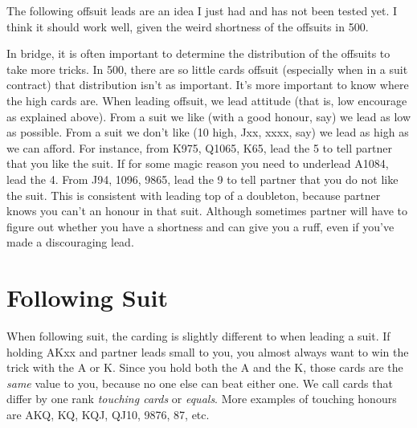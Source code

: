 \documentclass[a4paper]{report}
\theoremstyle{question}
\theoremstyle{theorem}
\theoremstyle{definition}
\newcommand{\<}{\left\langle}%
\renewcommand{\>}{\right\rangle}%
\begin{document}

The following offsuit leads are an idea I just had and has not been tested yet. I think it should work well, given the weird shortness of the offsuits in 500.

In bridge, it is often important to determine the distribution of the offsuits to take more tricks. In 500, there are so little cards offsuit (especially when in a suit contract) that distribution isn't as important. It's more important to know where the high cards are. When leading offsuit, we lead attitude (that is, low encourage as explained above). From a suit we like (with a good honour, say) we lead as low as possible. From a suit we don't like (10 high, Jxx, xxxx, say) we lead as high as we can afford. For instance, from K975, Q1065, K65, lead the 5 to tell partner that you like the suit. If for some magic reason you need to underlead A1084, lead the 4. From J94, 1096, 9865, lead the 9 to tell partner that you do not like the suit. This is consistent with leading top of a doubleton, because partner knows you can't an honour in that suit. Although sometimes partner will have to figure out whether you have a shortness and can give you a ruff, even if you've made a discouraging lead.



\section*{Following Suit}

When following suit, the carding is slightly different to when leading a suit. If holding AKxx and partner leads small to you, you almost always want to win the trick with the A or K. Since you hold both the A and the K, those cards are the \textit{same} value to you, because no one else can beat either one. We call cards that differ by one rank \textit{touching cards} or \textit{equals}. More examples of touching honours are AKQ, KQ, KQJ, QJ10, 9876, 87, etc.
\end{document}

